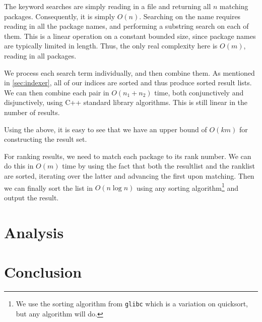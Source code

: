 \documentclass{article}
\begin{document}
The keyword searches are simply reading in a file and returning all $n$ matching packages. Consequently, it is simply $O(n)$. Searching on the name requires reading in all the package names, and performing a substring search on each of them. This is a linear operation on a constant bounded size, since package names are typically limited in length. Thus, the only real complexity here is $O(m)$, reading in all packages.

We process each search term individually, and then combine them. As mentioned in \autoref{sec:indexer}, all of our indices are sorted and thus produce sorted result lists. We can then combine each pair in $O(n_1 + n_2)$ time, both conjunctively and disjunctively, using C++ standard library algorithms. This is still linear in the number of results.

Using the above, it is easy to see that we have an upper bound of $O(km)$ for constructing the result set.

For ranking results, we need to match each package to its rank number. We can do this in $O(m)$ time by using the fact that both the resultlist and the ranklist are sorted, iterating over the latter and advancing the first upon matching. Then we can finally sort the list in $O(n \log n)$ using any sorting algorithm\footnote{We use the sorting algorithm from \texttt{glibc} which is a variation on quicksort, but any algorithm will do.} and output the result.

\section{Analysis}

\section{Conclusion}

{}

\end{document}
